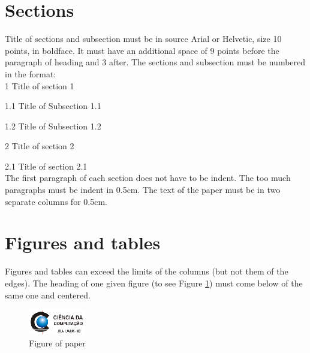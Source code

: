 \documentclass[10pt]{article}
\begin{document}
\section{Sections}

Title of sections and subsection must be in source Arial or Helvetic,
size 10 points, in boldface. It must have an additional space of 9
points before the paragraph of heading and 3 after. The sections and
subsection must be numbered in the format: \\

1 Title of section 1

1.1 Title of Subsection 1.1

1.2 Title of Subsection 1.2

2 Title of section 2

2.1 Title of section 2.1\\

The first paragraph of each section does not have to be indent. The
too much paragraphs must be indent in 0.5cm. The text of the paper
must be in two separate columns for 0.5cm.

\section{Figures and tables}

Figures and tables can exceed the limits of the columns (but not them
of the edges). The heading of one given figure (to see Figure
\ref{fig:1}) must come below of the same one and centered.

\begin{figure}[!htbpH]
  \begin{center}
    \includegraphics[scale=3]{exfigura}
    \caption{Figure of paper}
    \label{fig:1}
  \end{center}
\end{figure}
\end{document}
